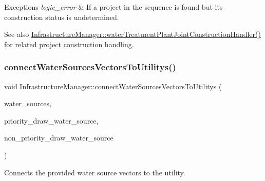 \begin{DoxyExceptions}{Exceptions}
{\em logic\+\_\+error} & If a project in the sequence is found but its construction status is undetermined.\\
\hline
\end{DoxyExceptions}
\begin{DoxySeeAlso}{See also}
\mbox{\hyperlink{classInfrastructureManager_a669881b881b090b3dd8fe70e3ffbf7f6}{Infrastructure\+Manager\+::water\+Treatment\+Plant\+Joint\+Construction\+Handler()}} for related project construction handling. 
\end{DoxySeeAlso}
\mbox{\label{classInfrastructureManager_a8ff698443fd4f32e28677aa9ef34c2dc}} 
\subsubsection{\texorpdfstring{connect\+Water\+Sources\+Vectors\+To\+Utilitys()}{connectWaterSourcesVectorsToUtilitys()}}
{\footnotesize\ttfamily void Infrastructure\+Manager\+::connect\+Water\+Sources\+Vectors\+To\+Utilitys (\begin{DoxyParamCaption}\item[{vector$<$ \mbox{\hyperlink{classWaterSource}{Water\+Source}} $\ast$$>$ \&}]{water\+\_\+sources,  }\item[{vector$<$ int $>$ \&}]{priority\+\_\+draw\+\_\+water\+\_\+source,  }\item[{vector$<$ int $>$ \&}]{non\+\_\+priority\+\_\+draw\+\_\+water\+\_\+source }\end{DoxyParamCaption})}



Connects the provided water source vectors to the utility. 

